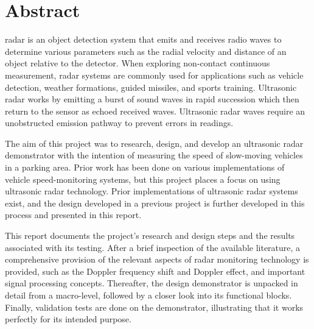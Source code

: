 \documentclass[class=report,11pt,crop=false]{standalone}
\begin{document}

\chapter*{Abstract}
\gls{radar} is an object detection system that emits and receives radio waves to determine various parameters such as the radial velocity and distance of an object relative to the detector. When exploring non-contact continuous measurement, \gls{radar} systems are commonly used for applications such as vehicle detection, weather formations, guided missiles, and sports training. Ultrasonic \gls{radar} works by emitting a burst of sound waves in rapid succession which then return to the sensor as echoed received waves. Ultrasonic \gls{radar} waves require an unobstructed emission pathway to prevent errors in readings.

The aim of this project was to research, design, and develop an ultrasonic \gls{radar} demonstrator with the intention of measuring the speed of slow-moving vehicles in a parking area. Prior work has been done on various implementations of vehicle speed-monitoring systems, but this project places a focus on using ultrasonic radar technology. Prior implementations of ultrasonic radar systems exist, and the design developed in a previous project is further developed in this process and presented in this report.

This report documents the project's research and design steps and the results associated with its testing. After a brief inspection of the available literature, a comprehensive provision of the relevant aspects of \gls{radar} monitoring technology is provided, such as the Doppler frequency shift and Doppler effect, and important signal processing concepts. Thereafter, the design demonstrator is unpacked in detail from a macro-level, followed by a closer look into its functional blocks. Finally, validation tests are done on the demonstrator, illustrating that it works perfectly for its intended purpose.


\ifstandalone
% 
\fi
\end{document}
